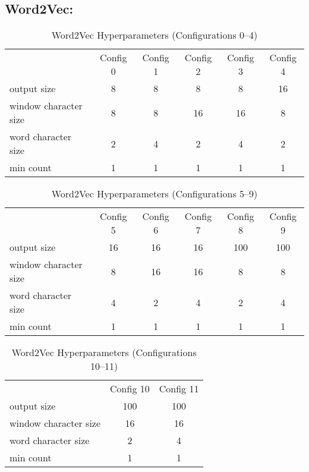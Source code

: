     \subsection{Word2Vec:}
        \begin{table}[ht]
            \centering
            \caption{Word2Vec Hyperparameters (Configurations 0–4)}
            \begin{tabular}{lccccc}
                & Config 0 & Config 1 & Config 2 & Config 3 & Config 4 \\
                output size & 8 & 8 & 8 & 8 & 16 \\
                window character size & 8 & 8 & 16 & 16 & 8 \\
                word character size & 2 & 4 & 2 & 4 & 2 \\
                min count & 1 & 1 & 1 & 1 & 1 \\
            \end{tabular}
        \end{table}

        \begin{table}[ht]
            \centering
            \caption{Word2Vec Hyperparameters (Configurations 5–9)}
            \begin{tabular}{lccccc}
                & Config 5 & Config 6 & Config 7 & Config 8 & Config 9 \\
                output size & 16 & 16 & 16 & 100 & 100 \\
                window character size & 8 & 16 & 16 & 8 & 8 \\
                word character size & 4 & 2 & 4 & 2 & 4 \\
                min count & 1 & 1 & 1 & 1 & 1 \\
            \end{tabular}
        \end{table}

        \begin{table}[ht]
            \centering
            \caption{Word2Vec Hyperparameters (Configurations 10–11)}
            \begin{tabular}{lcc}
                & Config 10 & Config 11 \\
                output size & 100 & 100 \\
                window character size & 16 & 16 \\
                word character size & 2 & 4 \\
                min count & 1 & 1 \\
            \end{tabular}
        \end{table}
    
